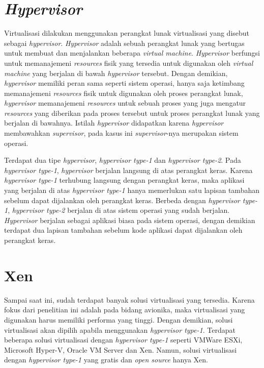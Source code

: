 \section{\textit{Hypervisor}}

Virtualisasi dilakukan menggunakan perangkat lunak virtualisasi yang disebut sebagai
\textit{hypervisor}.  \textit{Hypervisor} adalah sebuah perangkat lunak yang bertugas untuk
membuat dan menjalankan beberapa \textit{virtual machine}.  \textit{Hypervisor} berfungsi untuk
memanajemeni \textit{resources} fisik yang tersedia untuk digunakan oleh \textit{virtual
machine} yang berjalan di bawah \textit{hypervisor} tersebut.  Dengan demikian,
\textit{hypervisor} memiliki peran sama seperti sistem operasi, hanya saja ketimbang
memanajemeni \textit{resources} fisik untuk digunakan oleh proses perangkat lunak,
\textit{hypervisor} memanajemeni \textit{resources} untuk sebuah proses yang juga mengatur
\textit{resources} yang diberikan pada proses tersebut untuk proses perangkat lunak yang
berjalan di bawahnya.  Istilah \textit{hypervisor} didapatkan karena \textit{hypervisor}
membawahkan \textit{supervisor}, pada kasus ini \textit{supervisor}-nya merupakan sistem
operasi.

Terdapat dua tipe \textit{hypervisor}, \textit{hypervisor type-1} dan \textit{hypervisor
type-2}. Pada \textit{hypervisor type-1}, \textit{hypervisor} berjalan langsung di atas
perangkat keras. Karena \textit{hypervisor type-1} terhubung langsung dengan perangkat keras,
maka aplikasi yang berjalan di atas \textit{hypervisor type-1} hanya memerlukan satu lapisan
tambahan sebelum dapat dijalankan oleh perangkat keras. Berbeda dengan \textit{hypervisor
type-1}, \textit{hypervisor type-2} berjalan di atas sistem operasi yang sudah berjalan.
\textit{Hypervisor} berjalan sebagai aplikasi biasa pada sistem operasi, dengan demikian
terdapat dua lapisan tambahan sebelum kode aplikasi dapat dijalankan oleh perangkat keras.

\section{Xen}

Sampai saat ini, sudah terdapat banyak solusi virtualisasi yang tersedia. Karena fokus dari
penelitian ini adalah pada bidang avionika, maka virtualisasi yang digunakan harus memiliki
performa yang tinggi. Dengan demikian, solusi virtualisasi akan dipilih apabila menggunakan
\textit{hypervisor type-1}. Terdapat beberapa solusi virtualisasi dengan \textit{hypervisor
type-1} seperti VMWare ESXi, Microsoft Hyper-V, Oracle VM Server dan Xen. Namun, solusi
virtualisasi dengan \textit{hypervisor type-1} yang gratis dan \textit{open source} hanya Xen.

